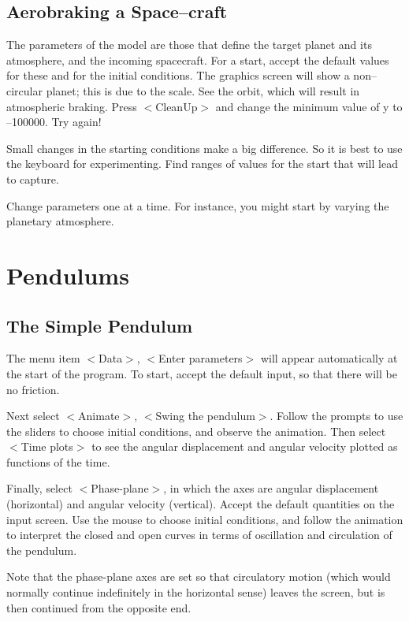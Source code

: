\subsection{Aerobraking a Space--craft}

   The parameters of the model are those that define the target
planet and its atmosphere, and the incoming spacecraft. For a start,
accept the default values for these and for the initial conditions.
The graphics screen will show a non--circular planet; this is due to
the scale. See the orbit, which will result in atmospheric braking.
Press $<$CleanUp$>$ and change the minimum value of y to --100000. Try again!

   Small changes in the starting conditions make a big difference.
So it is best to use the keyboard for experimenting. Find ranges
of values for the start that will lead to capture.

   Change parameters one at a time. For instance, you might start by
   varying the planetary atmosphere.


\section{Pendulums}


\subsection{The Simple Pendulum}

   The menu item $<$Data$>$, $<$Enter parameters$>$ will appear automatically
at the start of the program. To start, accept the default input, so
that there will be no friction.

   Next select $<$Animate$>$, $<$Swing the pendulum$>$. Follow the prompts to
use the sliders to choose initial conditions, and observe the animation.
Then select $<$Time plots$>$ to see the angular displacement and angular
velocity plotted as functions of the time.

   Finally, select $<$Phase-plane$>$, in which the axes are angular displacement
(horizontal) and angular velocity (vertical). Accept the default quantities
on the input screen. Use the mouse to choose initial conditions, and
follow the animation to interpret the closed and open curves in terms of
oscillation and circulation of the pendulum.

   Note that the phase-plane axes are set so that circulatory motion 
(which would normally continue indefinitely in the horizontal sense)
leaves the screen, but is then continued from the opposite end.

